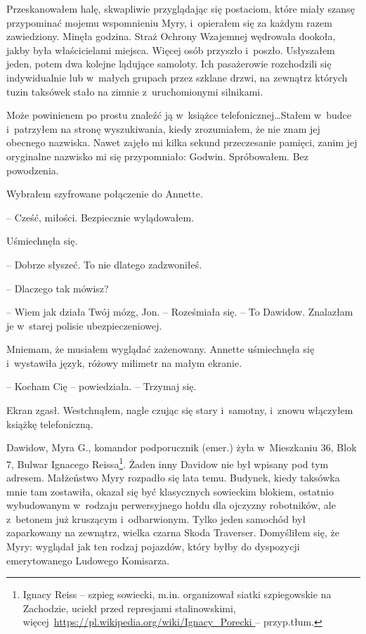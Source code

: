 \documentclass[oneside,polish,11pt,sfheadings]{mwbk}
\begin{document}
Przeskanowałem halę, skwapliwie przyglądając się postaciom, które miały
szansę przypominać mojemu wspomnieniu Myry, i~opierałem się za każdym
razem zawiedziony. Minęła godzina. Straż Ochrony Wzajemnej wędrowała
dookoła, jakby była właścicielami miejsca. Więcej osób przyszło i~poszło. Usłyszałem jeden, potem dwa kolejne lądujące samoloty. Ich
pasażerowie rozchodzili się indywidualnie lub w~małych grupach przez
szklane drzwi, na zewnątrz których tuzin taksówek stało na zimnie z~uruchomionymi silnikami.

Może powinienem po prostu znaleźć ją w~książce telefonicznej\ldots Stałem w~budce i~patrzyłem na stronę wyszukiwania, kiedy zrozumiałem, że nie znam
jej obecnego nazwiska. Nawet zajęło mi kilka sekund przeczesanie
pamięci, zanim jej oryginalne nazwisko mi się przypomniało: Godwin.
Spróbowałem. Bez powodzenia.

Wybrałem szyfrowane połączenie do Annette.

-- Cześć, miłości. Bezpiecznie wylądowałem.

Uśmiechnęła się. 

-- Dobrze słyszeć. To nie dlatego zadzwoniłeś.

-- Dlaczego tak mówisz?

-- Wiem jak działa Twój mózg, Jon. -- Roześmiała się. -- To Dawidow.
Znalazłam je w~starej polisie ubezpieczeniowej.

Mniemam, że musiałem wyglądać zażenowany. Annette uśmiechnęła się i~wystawiła język, różowy milimetr na małym ekranie. 

-- Kocham Cię -- powiedziała. -- Trzymaj się.

Ekran zgasł. Westchnąłem, nagle czując się stary i~samotny, i~znowu
włączyłem książkę telefoniczną.

Dawidow, Myra G., komandor podporucznik (emer.) żyła w~Mieszkaniu 36,
Blok 7, Bulwar Ignacego Reissa\footnote{Ignacy Reiss -- szpieg sowiecki,
m.in. organizował siatki szpiegowskie na Zachodzie, uciekł przed
represjami stalinowskimi, więcej~\url{https://pl.wikipedia.org/wiki/Ignacy_Porecki } -- przyp.tłum.}. Żaden inny Davidow nie był wpisany pod tym adresem.
Małżeństwo Myry rozpadło się lata temu. Budynek, kiedy taksówka mnie tam
zostawiła, okazał się być klasycznych sowieckim blokiem, ostatnio
wybudowanym w~rodzaju perwersyjnego hołdu dla ojczyzny robotników, ale z~betonem już kruszącym i~odbarwionym. Tylko jeden samochód był
zaparkowany na zewnątrz, wielka czarna Skoda Traverser. Domyśliłem się,
że Myry: wyglądał jak ten rodzaj pojazdów, który byłby do dyspozycji
emerytowanego Ludowego Komisarza.
\end{document}
